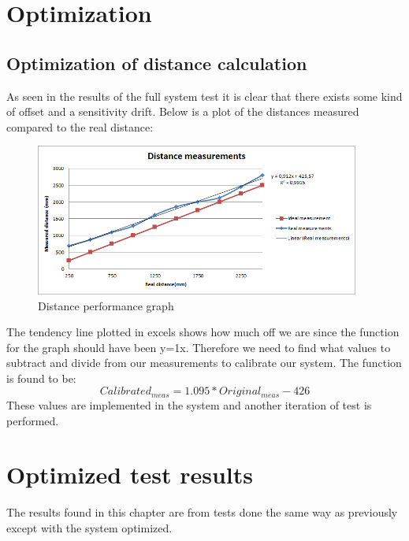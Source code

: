 \section{Optimization}
\subsection{Optimization of distance calculation}
As seen in the results of the full system test it is clear that there exists some kind of offset and a sensitivity drift. Below is a plot of the distances measured compared to the real distance:\\
\begin{figure}[H]
\centering
\includegraphics[width=0.95\textwidth]{billeder/first_test_results_graph}
\caption{Distance performance graph}
\end{figure}
The tendency line plotted in excels shows how much off we are since the function for the graph should have been y=1x. Therefore we need to find what values to subtract and divide from our measurements to calibrate our system. The function is found to be:\\
\begin{equation}
Calibrated_{meas}=1.095*Original_{meas}-426
\end{equation}
These values are implemented in the system and another iteration of test is performed.\\
\section{Optimized test results}
The results found in this chapter are from tests done the same way as previously except with the system optimized.
